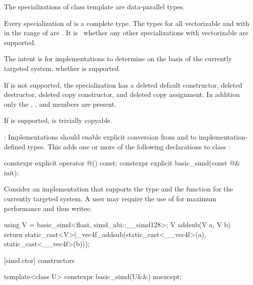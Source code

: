 \pnum
The specializations of class template  are data-parallel types.

\pnum
Every specialization of  is a complete type.
The types  for all vectorizable
 and with  in the range of \tcode{[1, 64]} are .
It is \impdef\ whether any other  specializations
with vectorizable  are supported.

\begin{note}
  The intent is for implementations to determine on the basis of the currently
  targeted system, whether  is supported.
\end{note}

If  is not supported, the specialization has a
deleted default constructor, deleted destructor, deleted copy constructor, and
deleted copy assignment.
In addition only the , , and
 members are present.

If  is supported,  is
trivially copyable.

\pnum\recommended:
Implementations should enable explicit conversion from and to
implementation-defined types. This adds one or more of the following
declarations to class :

\begin{codeblock}
constexpr explicit operator @\impdef@() const;
constexpr explicit basic_simd(const @\impdef@& init);
\end{codeblock}

\begin{example}
  Consider an implementation that supports the type  and the function  for the currently targeted system.
  A user may require the use of  for maximum performance and thus writes:
  \begin{codeblock}
    using V = basic_simd<float, simd_abi::__simd128>;
    V addsub(V a, V b) {
      return static_cast<V>(_vec4f_addsub(static_cast<__vec4f>(a), static_cast<__vec4f>(b)));
    }
  \end{codeblock}
\end{example}


[simd.ctor]{ constructors}

\begin{itemdecl}
template<class U> constexpr basic_simd(U&&) noexcept;
\end{itemdecl}

